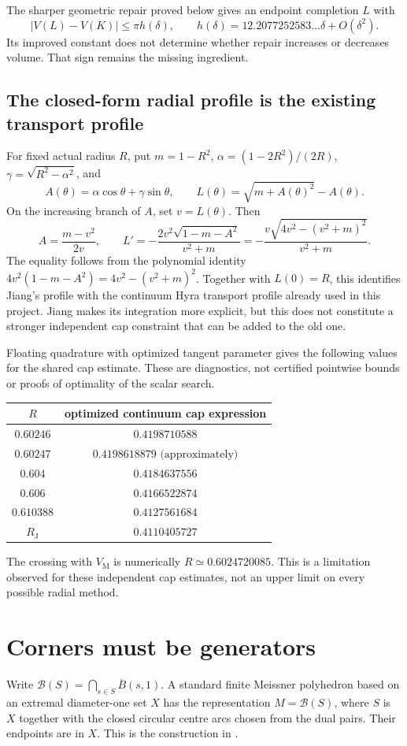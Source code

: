 \documentclass[11pt]{article}
\theoremstyle{remark}\newtheorem{remark}[theorem]{Remark}
\newcommand{\VM}{V_{\mathrm M}}
\newcommand{\RJ}{R_{\mathrm J}}
\newcommand{\B}{\mathcal B}
\begin{document}
The sharper geometric repair proved below gives
an endpoint completion $L$ with
\[
 |V(L)-V(K)|\leq\pi h(\delta),\qquad
 h(\delta)=12.2077252583\ldots\delta+O(\delta^2).
\]
Its improved constant does not determine whether repair increases or
decreases volume. That sign remains the missing ingredient.

\subsection{The closed-form radial profile is the existing transport profile}
For fixed actual radius $R$, put $m=1-R^2$,
$\alpha=(1-2R^2)/(2R)$, $\gamma=\sqrt{R^2-\alpha^2}$, and
\[
 A(\theta)=\alpha\cos\theta+\gamma\sin\theta,\qquad
 L(\theta)=\sqrt{m+A(\theta)^2}-A(\theta).
\]
On the increasing branch of $A$, set $v=L(\theta)$. Then
\[
 A=\frac{m-v^2}{2v},\qquad
 L'=-\frac{2v^2\sqrt{1-m-A^2}}{v^2+m}
    =-\frac{v\sqrt{4v^2-(v^2+m)^2}}{v^2+m}.
\]
The equality follows from the polynomial identity
$4v^2(1-m-A^2)=4v^2-(v^2+m)^2$.
Together with $L(0)=R$, this identifies Jiang's profile with the
continuum Hyra transport profile already used in this project.
Jiang makes its integration more explicit, but this does not constitute
a stronger independent cap constraint that can be added to the old one.

Floating quadrature with optimized tangent parameter gives the following
values for the shared cap estimate. These are diagnostics, not certified
pointwise bounds or proofs of optimality of the scalar search.
\begin{center}
\begin{tabular}{cc}
\toprule
$R$ & optimized continuum cap expression\\
\midrule
$0.60246$ & $0.4198710588$\\
$0.60247$ & $0.4198618879\text{ (approximately)}$\\
$0.604$ & $0.4184637556$\\
$0.606$ & $0.4166522874$\\
$0.610388$ & $0.4127561684$\\
$\RJ$ & $0.4110405727$\\
\bottomrule
\end{tabular}
\end{center}
The crossing with $\VM$ is numerically $R\simeq0.6024720085$.
This is a limitation observed for these independent cap estimates,
not an upper limit on every possible radial method.


\section{Corners must be generators}\label{jiang:corners}
Write $\B(S)=\bigcap_{s\in S}\overline B(s,1)$.
A standard finite Meissner polyhedron based on an extremal diameter-one set
$X$ has the representation $M=\B(S)$, where $S$ is $X$ together with the
closed circular centre arcs chosen from the dual pairs. Their endpoints are
in $X$. This is the construction in \cite[Section 4]{HyndDensity}.
\end{document}
